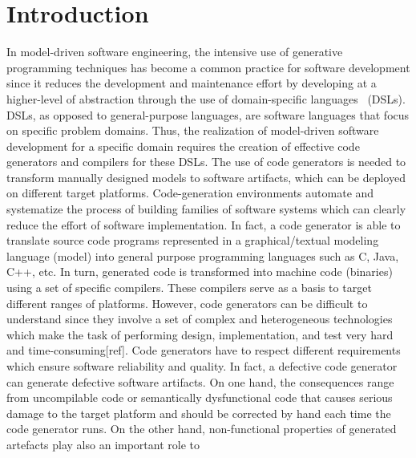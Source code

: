 \section{Introduction}
In model-driven software engineering, the intensive use of generative programming techniques has become a common practice for software development since it reduces the development and maintenance effort by developing at a higher-level of abstraction through the use of domain-specific languages~\cite{brambilla2012model} (DSLs). 
DSLs, as opposed to general-purpose languages, are software languages that focus on specific problem domains. Thus, the realization of model-driven software development for a specific domain requires the creation of effective code generators and compilers for these DSLs.
The use of code generators is needed to transform manually designed models to software artifacts, which can be deployed on different target platforms. 
Code-generation environments automate and systematize the process of building
families of software systems which can clearly reduce the effort of software implementation. In fact, a code generator is able to translate source code programs represented in a graphical/textual modeling language (model) into general purpose programming languages such as C, Java, C++, etc. In turn, generated code is transformed into machine code (binaries) using a set of specific compilers.
These compilers serve as a basis to target different ranges of platforms. 
However, code generators can be difficult to understand since they involve a set of complex and heterogeneous technologies which make the task of performing design, implementation, and test very hard and time-consuming[ref]. Code generators have to respect different requirements which ensure software reliability and quality. In fact, a defective code generator can generate defective software artifacts. On one hand, the consequences range from uncompilable code or semantically dysfunctional code that causes serious damage to the target platform and should be corrected by hand each time the code generator runs. On the other hand, non-functional properties of generated artefacts play also an important role to 

